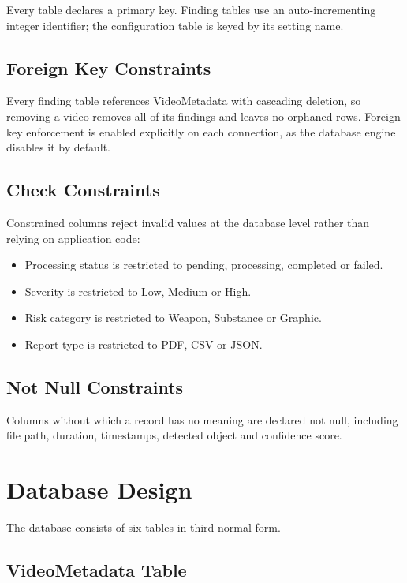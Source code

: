 \documentclass[12pt,a4paper,twoside]{report}
\begin{document}
Every table declares a primary key. Finding tables use an auto-incrementing integer identifier; the configuration table is keyed by its setting name.

\subsection{Foreign Key Constraints}

Every finding table references VideoMetadata with cascading deletion, so removing a video removes all of its findings and leaves no orphaned rows. Foreign key enforcement is enabled explicitly on each connection, as the database engine disables it by default.

\subsection{Check Constraints}

Constrained columns reject invalid values at the database level rather than relying on application code:

\begin{itemize}
\item Processing status is restricted to pending, processing, completed or failed.
\item Severity is restricted to Low, Medium or High.
\item Risk category is restricted to Weapon, Substance or Graphic.
\item Report type is restricted to PDF, CSV or JSON.
\end{itemize}

\subsection{Not Null Constraints}

Columns without which a record has no meaning are declared not null, including file path, duration, timestamps, detected object and confidence score.

\section{Database Design}

The database consists of six tables in third normal form.

\subsection{VideoMetadata Table}
\end{document}
